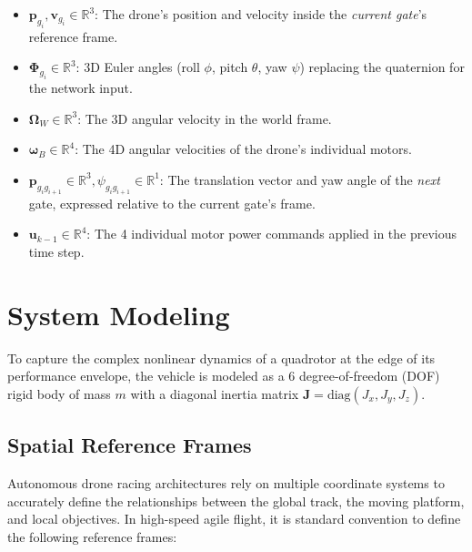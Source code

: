 \documentclass{article}
\begin{document}
\begin{enumerate}
    \begin{itemize}
    \item $\mathbf{p}_{g_i}, \mathbf{v}_{g_i} \in \mathbb{R}^3$: The drone's position and velocity inside the \textit{current gate}'s reference frame.
    \item $\mathbf{\Phi}_{g_i} \in \mathbb{R}^3$: 3D Euler angles (roll $\phi$, pitch $\theta$, yaw $\psi$) replacing the quaternion for the network input.
    \item $\mathbf{\Omega}_W \in \mathbb{R}^3$: The 3D angular velocity in the world frame.
    \item $\boldsymbol{\omega}_B \in \mathbb{R}^4$: The 4D angular velocities of the drone's individual motors.
    \item $\mathbf{p}_{g_i g_{i+1}} \in \mathbb{R}^3, \psi_{g_i g_{i+1}} \in \mathbb{R}^1$: The translation vector and yaw angle of the \textit{next} gate, expressed relative to the current gate's frame.
    \item $\mathbf{u}_{k-1} \in \mathbb{R}^4$: The 4 individual motor power commands applied in the previous time step.
    \end{itemize}
\end{enumerate}

\section{System Modeling}

To capture the complex nonlinear dynamics of a quadrotor at the edge of its performance envelope, the vehicle is modeled as a 6 degree-of-freedom (DOF) rigid body of mass $m$ with a diagonal inertia matrix $\mathbf{J} = \text{diag}(J_x, J_y, J_z)$. 

\subsection{Spatial Reference Frames}
Autonomous drone racing architectures rely on multiple coordinate systems to accurately define the relationships between the global track, the moving platform, and local objectives. In high-speed agile flight, it is standard convention to define the following reference frames:
\end{document}
